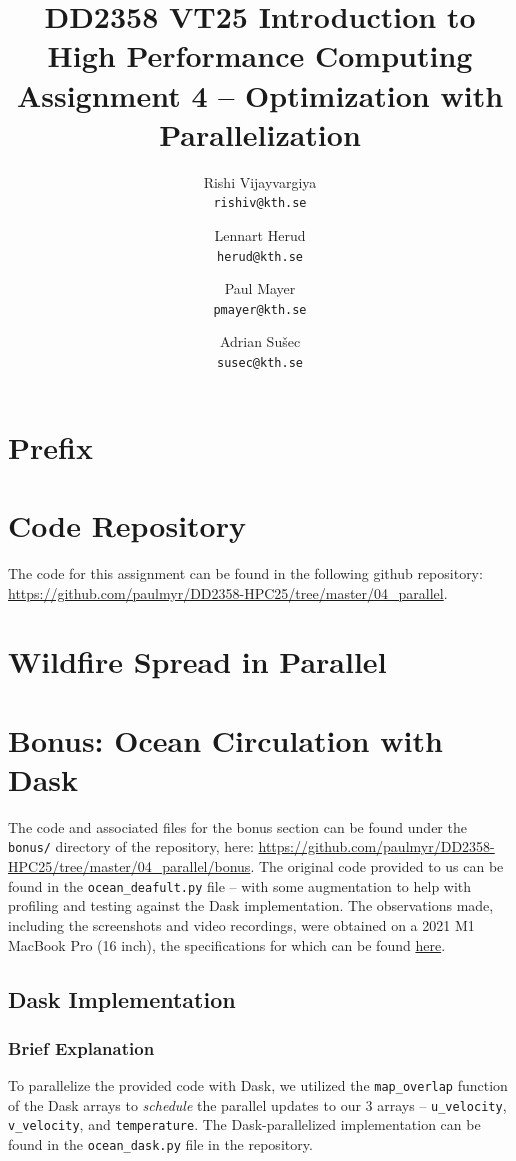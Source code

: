 \documentclass[a4paper,12pt]{article}
\title{
  \normalsize{DD2358 VT25 Introduction to}\\
  \normalsize{High Performance Computing}\\
  \large{Assignment 4 -- Optimization with Parallelization}\\
}
\author{
  \small Rishi Vijayvargiya\\[-0.75ex]
  \scriptsize\texttt{rishiv@kth.se}
  \and
  \small Lennart Herud\\[-0.75ex]
  \scriptsize\texttt{herud@kth.se}
  \and
  \small Paul Mayer\\[-0.75ex]
  \scriptsize\texttt{pmayer@kth.se}
  \and
  \small Adrian Sušec\\[-0.75ex]
  \scriptsize\texttt{susec@kth.se}
}
\date{}
\begin{document}
\maketitle
\thispagestyle{firstpagestyle}

\listoftodos

\vspace{1em}

%
\section*{Prefix}

%

\section{Code Repository}
The code for this assignment can be found in the following github repository: \url{https://github.com/paulmyr/DD2358-HPC25/tree/master/04_parallel}.

\section{Wildfire Spread in Parallel}



\section{Bonus: Ocean Circulation with Dask}
The code and associated files for the bonus section can be found under the \verb|bonus/| directory of the repository, here: \url{https://github.com/paulmyr/DD2358-HPC25/tree/master/04_parallel/bonus}. The original code provided to us can be found in the \verb|ocean_deafult.py| file -- with some augmentation to help with profiling and testing against the Dask implementation. The observations made, including the screenshots and video recordings, were obtained on a 2021 M1 MacBook Pro (16 inch), the specifications for which can be found \href{https://support.apple.com/en-us/111901}{here}.

\subsection{Dask Implementation}

\subsubsection{Brief Explanation}
To parallelize the provided code with Dask, we utilized the \verb|map_overlap| function of the Dask arrays to \textit{schedule} the parallel updates to our 3 arrays -- \verb|u_velocity|, \verb|v_velocity|, and \verb|temperature|. The Dask-parallelized implementation can be found in the \verb|ocean_dask.py| file in the repository.
\end{document}
